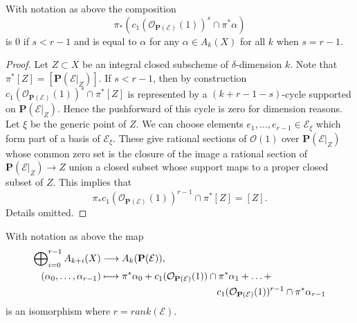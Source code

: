 \begin{lemma}
\label{lemma-cap-projective-bundle}
With notation as above the composition
$$
\pi_*\left(
c_1(\mathcal{O}_{\mathbf{P}(\mathcal{E})}(1))^s \cap \pi^*\alpha
\right)
$$
is $0$ if $s < r - 1$ and is equal to $\alpha$
for any $\alpha \in A_k(X)$ for all $k$ when $s = r - 1$.
\end{lemma}

\begin{proof}
Let $Z \subset X$ be an integral closed subscheme of $\delta$-dimension $k$.
Note that $\pi^*[Z] = [\mathbf{P}(\mathcal{E}|_Z)]$.
If $s < r - 1$, then by construction
$c_1(\mathcal{O}_{\mathbf{P}(\mathcal{E})}(1))^s \cap \pi^*[Z]$
is represented by a $(k + r - 1 - s)$-cycle supported on
$\mathbf{P}(\mathcal{E}|_Z)$. Hence the pushforward of this cycle
is zero for dimension reasons.
Let $\xi$ be the generic point of $Z$.
We can choose elements $e_1, \ldots, e_{r - 1} \in \mathcal{E}_\xi$
which form part of a basis of $\mathcal{E}_\xi$. These give rational
sections of $\mathcal{O}(1)$ over $\mathbf{P}(\mathcal{E}|_Z)$
whose common zero set is the closure of the image a rational section of
$\mathbf{P}(\mathcal{E}|_Z) \to Z$ union a closed subset whose
support maps to a proper closed subset of $Z$. This implies that
$$
\pi_* c_1(\mathcal{O}_{\mathbf{P}(\mathcal{E})}(1))^{r - 1} \cap \pi^*[Z]
=
[Z].
$$
Details omitted.
\end{proof}

\begin{lemma}
\label{lemma-chow-ring-projective-bundle}
With notation as above the map
\begin{align*}
\bigoplus\nolimits_{i=0}^{r-1} A_{k + i}(X)
& \longrightarrow
A_k({\bf P}({\mathcal E})), \\
(\alpha_0,\ldots,\alpha_{r-1}) &
\longmapsto
\pi^*\alpha_0 +
c_1(\mathcal{O}_{\mathbf{P}(\mathcal{E})}(1)) \cap \pi^*\alpha_1
+ \ldots + \\
&
\quad \quad \quad \quad
\quad \quad \quad \quad
\quad \quad \quad \quad
c_1(\mathcal{O}_{\mathbf{P}(\mathcal{E})}(1))^{r - 1} \cap \pi^*\alpha_{r-1}
\end{align*}
is an isomorphism where $r = rank({\mathcal E})$.
\end{lemma}

